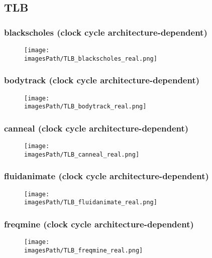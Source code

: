 \documentclass[12pt,a4paper]{article}
\newcommand{\imagesPath}{parsec-3.0/parsec_workspace/graphs}
\begin{document}
		\subsection{TLB}
			
			\subsubsection{blackscholes (clock cycle architecture-dependent)}
				\begin{figure}[H]
					\begin{center}
						\texttt{[image: \\imagesPath/TLB\_blackscholes\_real.png]}
					\end{center}
				\end{figure}
						
			\subsubsection{bodytrack (clock cycle architecture-dependent)}
				\begin{figure}[H]
					\begin{center}
						\texttt{[image: \\imagesPath/TLB\_bodytrack\_real.png]}
					\end{center}
				\end{figure}
						
			\subsubsection{canneal (clock cycle architecture-dependent)}
				\begin{figure}[H]
					\begin{center}
						\texttt{[image: \\imagesPath/TLB\_canneal\_real.png]}
					\end{center}
				\end{figure}
						
			\subsubsection{fluidanimate (clock cycle architecture-dependent)}
				\begin{figure}[H]
					\begin{center}
						\texttt{[image: \\imagesPath/TLB\_fluidanimate\_real.png]}
					\end{center}
				\end{figure}
						
			\subsubsection{freqmine (clock cycle architecture-dependent)}
				\begin{figure}[H]
					\begin{center}
						\texttt{[image: \\imagesPath/TLB\_freqmine\_real.png]}
					\end{center}
				\end{figure}
						
\end{document}
